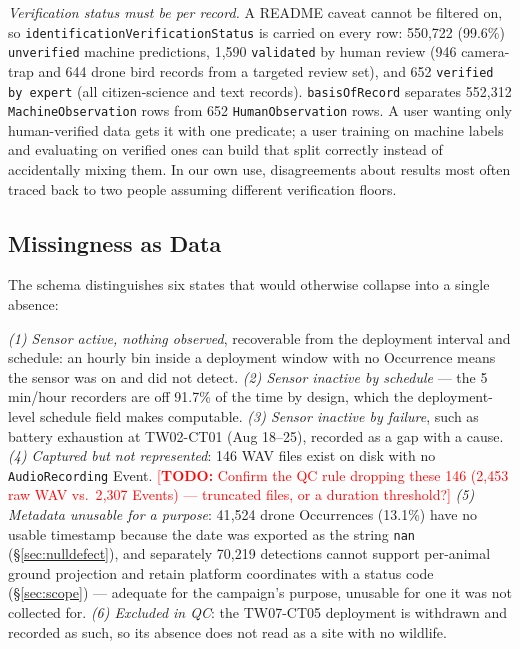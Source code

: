 \documentclass[sigconf]{acmart}
\newcommand{\TODO}[1]{\textcolor{red}{\footnotesize[\textbf{TODO:} #1]}}
\newcommand{\TODO}[1]{}
\begin{document}
\emph{Verification status must be per record.} A README caveat cannot be
filtered on, so \texttt{identification\allowbreak Verification\allowbreak Status} is carried on
every row: 550{,}722 (99.6\%) \texttt{unverified} machine predictions,
1{,}590 \texttt{validated} by human review (946 camera-trap and 644
drone bird records from a targeted review set), and 652
\texttt{verified by expert} (all citizen-science and text records).
\texttt{basisOfRecord} separates 552{,}312 \texttt{MachineObservation}
rows from 652 \texttt{HumanObservation} rows. A user wanting only
human-verified data gets it with one predicate; a user training on
machine labels and evaluating on verified ones can build that split
correctly instead of accidentally mixing them. In our own use, disagreements about
results most often traced back to two people assuming different
verification floors.

\subsection{Missingness as Data}

The schema distinguishes six states that would otherwise collapse into a
single absence:

\emph{(1) Sensor active, nothing observed}, recoverable from the
deployment interval and schedule: an hourly bin inside a deployment
window with no Occurrence means the sensor was on and did not detect.
\emph{(2) Sensor inactive by schedule} --- the 5\,min/hour recorders are
off 91.7\% of the time by design, which the deployment-level schedule
field makes computable. \emph{(3) Sensor inactive by failure}, such as
battery exhaustion at TW02-CT01 (Aug 18--25), recorded as a gap with a
cause. \emph{(4) Captured but not represented}: 146 WAV files exist on
disk with no \texttt{AudioRecording} Event.
\TODO{Confirm the QC rule dropping these 146 (2{,}453 raw WAV vs.\
2{,}307 Events) --- truncated files, or a duration threshold?}
\emph{(5) Metadata unusable for a purpose}: 41{,}524 drone Occurrences
(13.1\%) have no usable timestamp because the date was exported as the
string \texttt{nan} (\S\ref{sec:nulldefect}), and separately
70{,}219 detections cannot support per-animal ground projection and
retain platform coordinates with a status code (\S\ref{sec:scope}) ---
adequate for the campaign's purpose, unusable for one it was not
collected for. \emph{(6) Excluded in QC}: the TW07-CT05 deployment is
withdrawn and recorded as such, so its absence does not read as a site
with no wildlife.
\end{document}
